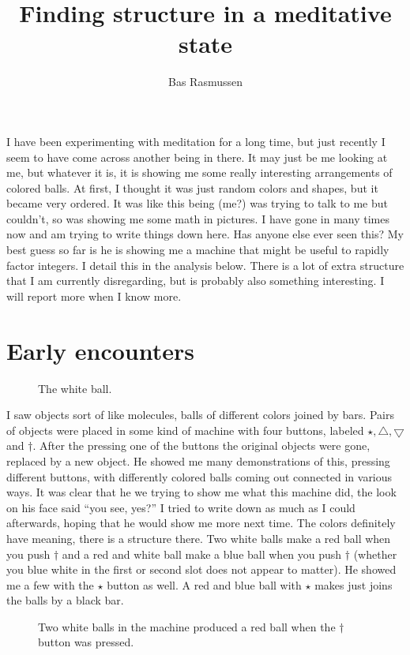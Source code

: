 \documentclass[12pt]{article}
\title{Finding structure in a meditative state}
\author{Bas Rasmussen}
\newcommand{\gcd}{\operatorname{gcd}}
\def\gcd{\bigtriangledown}
\def\lcm{\bigtriangleup}
\begin{document}
\maketitle
I have been experimenting with meditation for a long time, but just recently I seem to have come across another being in there.  It may just be me looking at me, but whatever it is, it is
showing me some really interesting arrangements of colored balls.  At first, I thought it was just random colors and shapes, but it became very ordered.  It was like this being (me?)
was trying to talk to me but couldn't, so was showing me some math in pictures.   I have gone in many times now and am trying to write things down here.  Has anyone else
ever seen this?  My best guess so far is he is showing me a machine that might be useful to rapidly factor integers.  I detail this in the analysis below.  There is a lot of extra structure
that I am currently disregarding, but is probably also something interesting.  I will report more when I know more.

\section{Early encounters}
\begin{figure}
\centering
{}
\caption{The white ball.}
\end{figure}

I saw objects sort of like molecules, balls of different colors joined by bars.   Pairs of objects were placed in
some kind of machine with four buttons, labeled $\star, \lcm, \gcd$ and $\dagger$.  After the pressing one of the buttons the original
objects were gone, replaced by a new object.  He showed me many demonstrations of this, pressing different buttons, with differently colored balls coming out
connected in various ways.  It was clear that he we trying to show me what this machine did, the look on his face said ``you see, yes?''  I tried to write down as much
as I could afterwards, hoping that he would show me more next time.  The colors definitely have meaning, there is a structure there.  Two white balls
make a red ball when you push $\dagger$ and a red and white ball make a blue ball when you push $\dagger$ (whether you blue white in the first or second slot
does not appear to matter).  He showed me a few with the $\star$ button as well.  A red and blue ball with $\star$ makes just joins the balls by a black bar.  
\begin{figure}
\centering
{}
\caption{Two white balls in the machine produced a red ball when the $\dagger$ button was pressed.}
\end{figure}
\end{document}
